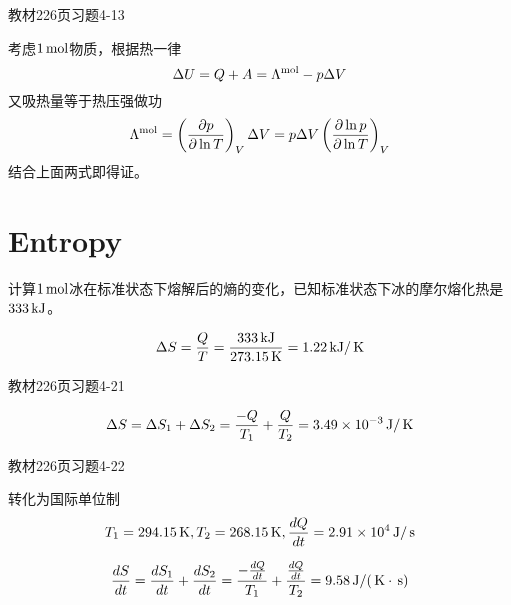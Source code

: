 \documentclass[CJK]{beamer}
\begin{document}
\begin{frame}
  \bch
  教材226页习题4-13
  \ech
\end{frame}


\begin{frame}
  \bch
      {\small
        考虑$1\,\mathrm{mol}$物质，根据热一律
        $$ \Delta U = Q + A = \Lambda^{\rm mol} - p \Delta V$$
        又吸热量等于热压强做功
        $$\Lambda^{\rm mol} = \left(\frac{\partial p}{\partial \ln T}\right)_{V} \Delta V = p\Delta V \left(\frac{\partial \ln p}{\partial \ln T}\right)_{V} $$
        结合上面两式即得证。
      }
  \ech
\end{frame}

\section{Entropy}

\begin{frame}

\end{frame}

\begin{frame}
  \bch
  计算$1\,\mathrm{mol}$冰在标准状态下熔解后的熵的变化，已知标准状态下冰的摩尔熔化热是$333\,\mathrm{kJ}$。
  \ech
\end{frame}

\begin{frame}
  \bch
$$\Delta S = \frac{Q}{T} = \frac{333 \,\mathrm{kJ}}{273.15\,\mathrm{K}} = 1.22 \,\mathrm{kJ}/\,\mathrm{K} $$
  \ech
\end{frame}


\begin{frame}
  \bch
  教材226页习题4-21
  \ech
\end{frame}


\begin{frame}
  \bch
  $$\Delta S =\Delta S_1 + \Delta S_2 =  \frac{-Q}{T_1} +\frac{Q}{T_2} = 3.49\times 10^{-3} \,\mathrm{J}/\,\mathrm{K}$$
  \ech
\end{frame}



\begin{frame}
  \bch
  教材226页习题4-22
  \ech
\end{frame}


\begin{frame}
  \bch
  转化为国际单位制
  $$T_1 = 294.15\,\mathrm{K}, T_2 = 268.15\,\mathrm{K}, \frac{dQ}{dt} = 2.91\times 10^4 \,\mathrm{J}/\,\mathrm{s}$$
  
  $$\frac{d S}{dt} = \frac{d S_1}{dt} + \frac{d S_2}{dt} = \frac{-\frac{dQ}{dt}}{T_1} +\frac{\frac{dQ}{dt}}{T_2} = 9.58 \,\mathrm{J}/(\,\mathrm{K}\cdot\,\mathrm{s})$$
  \ech
\end{frame}
\end{document}
